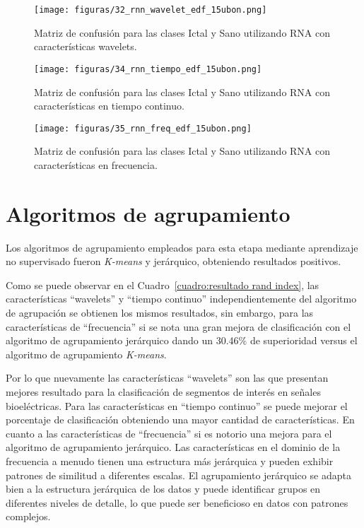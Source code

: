 \begin{figure}[H]
    \centering
    \texttt{[image: figuras/32\_rnn\_wavelet\_edf\_15ubon.png]}
    \caption{Matriz de confusión para las clases Ictal y Sano utilizando RNA con características wavelets.}
    \label{fig: Matriz confusion RNA wavelet}
\end{figure}
\begin{figure}[H]
    \centering
    \texttt{[image: figuras/34\_rnn\_tiempo\_edf\_15ubon.png]}
    \caption{Matriz de confusión para las clases Ictal y Sano utilizando RNA con características en tiempo continuo.}
    \label{fig: Matriz confusion RNA tiempo}
\end{figure}
\begin{figure}[H]
    \centering
    \texttt{[image: figuras/35\_rnn\_freq\_edf\_15ubon.png]}
    \caption{Matriz de confusión para las clases Ictal y Sano utilizando RNA con características en frecuencia.}
    \label{fig: Matriz confusion RNA freq}
\end{figure}

\section{Algoritmos de agrupamiento}
Los algoritmos de agrupamiento empleados para esta etapa mediante aprendizaje no supervisado fueron \textit{K-means} y jerárquico, obteniendo resultados positivos. 

Como se puede observar en el Cuadro~\ref{cuadro:resultado rand index}, las características ``wavelets'' y ``tiempo continuo'' independientemente del algoritmo de agrupación se obtienen los mismos resultados, sin embargo, para  las características de ``frecuencia'' si se nota una gran mejora de clasificación con el algoritmo de agrupamiento jerárquico dando un 30.46\% de superioridad versus el algoritmo de agrupamiento \textit{K-means}.

Por lo que nuevamente las características ``wavelets'' son las que presentan mejores resultado para la clasificación de segmentos de interés en señales bioeléctricas. Para las características en ``tiempo continuo'' se puede mejorar el porcentaje de clasificación obteniendo una mayor cantidad de características. En cuanto a las características de ``frecuencia'' si es notorio una mejora para el algoritmo de agrupamiento jerárquico. Las características en el dominio de la frecuencia a menudo tienen una estructura más jerárquica y pueden exhibir patrones de similitud a diferentes escalas. El agrupamiento jerárquico se adapta bien a la estructura jerárquica de los datos y puede identificar grupos en diferentes niveles de detalle, lo que puede ser beneficioso en datos con patrones complejos.

